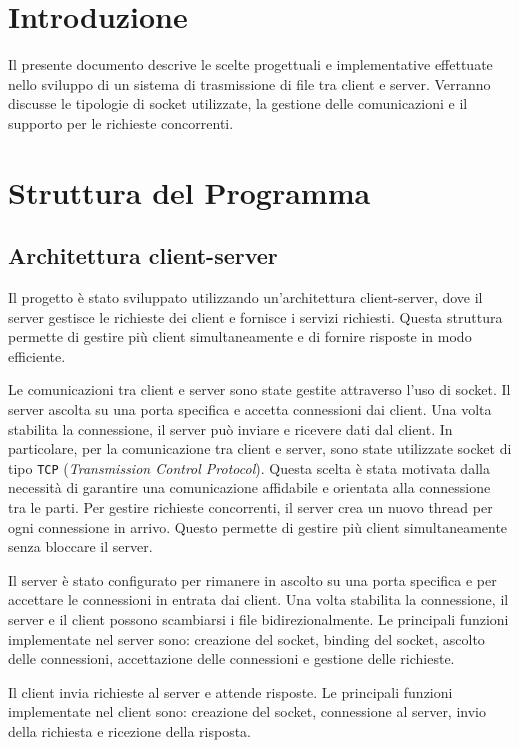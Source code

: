 \section{Introduzione}
Il presente documento descrive le scelte progettuali e implementative effettuate nello sviluppo di un sistema di trasmissione di file  tra client e server. Verranno discusse le tipologie di socket utilizzate, la gestione delle comunicazioni e il supporto per le richieste concorrenti.

\section{Struttura del Programma}
\subsection{Architettura client-server}
Il progetto è stato sviluppato utilizzando un'architettura client-server, dove il server gestisce le richieste dei client e fornisce i servizi richiesti. Questa struttura permette di gestire più client simultaneamente e di fornire risposte in modo efficiente.

Le comunicazioni tra client e server sono state gestite attraverso l'uso di socket. Il server ascolta su una porta specifica e accetta connessioni dai client. Una volta stabilita la connessione, il server può inviare e ricevere dati dal client. 
In particolare, per la comunicazione tra client e server, sono state utilizzate socket di tipo \texttt{TCP} (\textit{Transmission Control Protocol}). Questa scelta è stata motivata dalla necessità di garantire una comunicazione affidabile e orientata alla connessione tra le parti. Per gestire richieste concorrenti, il server crea un nuovo thread per ogni connessione in arrivo. Questo permette di gestire più client simultaneamente senza bloccare il server.

Il server è stato configurato per rimanere in ascolto su una porta specifica e per accettare le connessioni in entrata dai client. Una volta stabilita la connessione, il server e il client possono scambiarsi i file bidirezionalmente. Le principali funzioni implementate nel server sono: creazione del socket, binding del socket, ascolto delle connessioni, accettazione delle connessioni e gestione delle richieste.

Il client invia richieste al server e attende risposte. Le principali funzioni implementate nel client sono: creazione del socket, connessione al server, invio della richiesta e ricezione della risposta.

